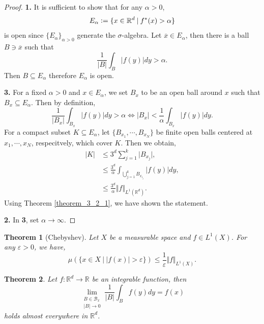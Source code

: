 \documentclass[8pt]{article}
\newtheorem{theorem}{Theorem} [section]
\newcommand{\norm}[1]{\Vert #1 \Vert}
\newcommand{\ab}[1]{\vert #1 \vert}
\newcommand{\sep}[0]{\:\vert\:}
\newcommand{\defeq}{\vcentcolon=}
\newcommand{\bR}[0]{\mathbb{R}}
\newcommand{\cB}[0]{\mathcal{B}}
\begin{document}
\begin{proof}
  \textbf{1.} It is sufficient to show that for any $\alpha>0$,
  \begin{equation*}
    E_\alpha\defeq\{x\in\bR^d\sep f^*(x)>\alpha\}
  \end{equation*}
  is open since $\{E_\alpha\}_{\alpha>0}$ generate the $\sigma$-algebra. Let $\overline{x}\in E_\alpha$, then there is a ball $B\ni \overline{x}$ such that 
  \begin{equation*}
    {\frac 1 {\ab{B}}}\int_B\ab{f(y)}dy>\alpha.
  \end{equation*}
  Then $B\subseteq E_\alpha$ therefore $E_\alpha$ is open.
  \par\textbf{3.} For a fixed $\alpha>0$ and $x\in E_\alpha$, we set $B_x$ to be an open ball around $x$ such that $B_x\subseteq E_\alpha$. Then by definition,
  \begin{equation*}
  {\frac 1 {\ab{B_x}}}\int_{B_x}\ab{f(y)}dy >\alpha\iff \ab{B_x}<{\frac 1 \alpha}\int_{B_x}\ab{f(y)}dy.
  \end{equation*}
  For a compact subset $K\subseteq E_\alpha$, let $\{B_{x_1},\cdots,B_{x_N}\}$ be finite open balls centered at $x_1,\cdots,x_N$, respecitvely, which cover $K$. Then we obtain,
  \begin{align*}
    \ab{K}&\leq 3^d\sum_{j=1}^k\ab{B_{x_j}},\\
    & \leq {\frac {3^d} \alpha}\int_{\bigcup_{j=1}^k B_{x_{i_j}}}\ab{f(y)}dy,\\
    &\leq {\frac {3^d} \alpha}\norm{f}_{L^1(\bR^d)}.
  \end{align*}
  Using Theorem \ref{theorem_3_2_1}, we have shown the statement.
  \par\textbf{2. } In \textbf{3}, set $\alpha\to\infty$.
\end{proof}
\begin{theorem}[Chebyshev]
  \label{theorem_3_3_1}
  Let $X$ be a measurable space and $f\in L^1(X)$. For any $\varepsilon>0$, we have,
  \begin{equation*}
    \mu(\{x\in X\sep \ab{f(x)}>\varepsilon\})\leq {\frac 1 {\varepsilon}}\norm{f}_{L^1(X)}.
  \end{equation*}
\end{theorem}
\begin{theorem}
  \label{theorem_3_3}
  Let $f:\bR^d\to\bR$ be an integrable function, then 
  \begin{equation*}
    \lim_{\substack{B\in\cB_x\\ \ab{B}\to 0}}{\frac 1 {\ab{B}}}\int_Bf(y)dy = f(x)
  \end{equation*}
  holds almost everywhere in $\bR^d$.
\end{theorem}
\end{document}
